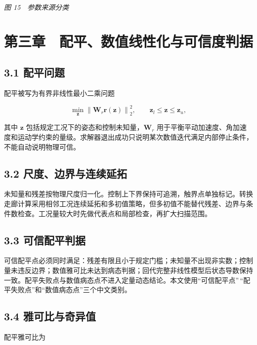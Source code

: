 \emph{图 15　参数来源分类}

\chapter{第三章　配平、数值线性化与可信度判据}\label{ux7b2cux4e09ux7ae0-ux914dux5e73ux6570ux503cux7ebfux6027ux5316ux4e0eux53efux4fe1ux5ea6ux5224ux636e}

\section{3.1 配平问题}\label{31-ux914dux5e73ux95eeux9898}

配平被写为有界非线性最小二乘问题

\[\min_{\mathbf{z}}\left\|\mathbf{W}_r\mathbf{r}(\mathbf{z})\right\|_2^2,
\qquad \mathbf{z}_l\leq\mathbf{z}\leq\mathbf{z}_u,\]

其中 \(\mathbf{z}\) 包括规定工况下的姿态和控制未知量，\(\mathbf{W}_r\)
用于平衡平动加速度、角加速度和运动学约束的量级。求解器退出成功只说明某次数值迭代满足内部停止条件，不能自动说明物理可信。

\section{3.2
尺度、边界与连续延拓}\label{32-ux5c3aux5ea6ux8fb9ux754cux4e0eux8fdeux7eedux5ef6ux62d3}

未知量和残差按物理尺度归一化。控制上下界保持可追溯，触界点单独标记。转换走廊计算采用相邻工况连续延拓和多初值策略，但多初值不能替代残差、边界与条件数检查。工况量较大时先做代表点和局部检查，再扩大扫描范围。

\section{3.3
可信配平判据}\label{33-ux53efux4fe1ux914dux5e73ux5224ux636e}

可信配平点必须同时满足：残差有限且小于规定门槛；未知量不出现非实数；控制量未违反边界；数值雅可比未达到病态判据；回代完整非线性模型后状态导数保持一致。配平失败点与数值病态点不进入定量动态结论。本文使用``可信配平点''\,``配平失败点''和``数值病态点''三个中文类别。

\section{3.4
雅可比与奇异值}\label{34-ux96c5ux53efux6bd4ux4e0eux5947ux5f02ux503c}

配平雅可比为

